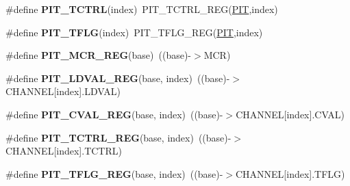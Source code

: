 \begin{DoxyCompactItemize}
\item 
\#define {\bfseries P\+I\+T\+\_\+\+T\+C\+T\+RL}(index)~P\+I\+T\+\_\+\+T\+C\+T\+R\+L\+\_\+\+R\+EG(\hyperlink{group__PIT__Peripheral__Access__Layer_gaf181c9e6602b6432a0bf1a9243808968}{P\+IT},index)\hypertarget{group__PIT__Register__Accessor__Macros_ga8208039ad04ced0f69ccc2cf4efd8e67}{}\label{group__PIT__Register__Accessor__Macros_ga8208039ad04ced0f69ccc2cf4efd8e67}

\item 
\#define {\bfseries P\+I\+T\+\_\+\+T\+F\+LG}(index)~P\+I\+T\+\_\+\+T\+F\+L\+G\+\_\+\+R\+EG(\hyperlink{group__PIT__Peripheral__Access__Layer_gaf181c9e6602b6432a0bf1a9243808968}{P\+IT},index)\hypertarget{group__PIT__Register__Accessor__Macros_ga8a2ba0e5f954639237f66f2613c60023}{}\label{group__PIT__Register__Accessor__Macros_ga8a2ba0e5f954639237f66f2613c60023}

\item 
\#define {\bfseries P\+I\+T\+\_\+\+M\+C\+R\+\_\+\+R\+EG}(base)~((base)-\/$>$M\+CR)\hypertarget{group__PIT__Register__Accessor__Macros_ga01f1ee5f7f451b1f6f7f1b3549c63303}{}\label{group__PIT__Register__Accessor__Macros_ga01f1ee5f7f451b1f6f7f1b3549c63303}

\item 
\#define {\bfseries P\+I\+T\+\_\+\+L\+D\+V\+A\+L\+\_\+\+R\+EG}(base,  index)~((base)-\/$>$C\+H\+A\+N\+N\+EL\mbox{[}index\mbox{]}.L\+D\+V\+AL)\hypertarget{group__PIT__Register__Accessor__Macros_gaa1c49ea81e45e7ae3407b2b804432381}{}\label{group__PIT__Register__Accessor__Macros_gaa1c49ea81e45e7ae3407b2b804432381}

\item 
\#define {\bfseries P\+I\+T\+\_\+\+C\+V\+A\+L\+\_\+\+R\+EG}(base,  index)~((base)-\/$>$C\+H\+A\+N\+N\+EL\mbox{[}index\mbox{]}.C\+V\+AL)\hypertarget{group__PIT__Register__Accessor__Macros_gaac9edbb5229fcbcd8d71f5fdeab96590}{}\label{group__PIT__Register__Accessor__Macros_gaac9edbb5229fcbcd8d71f5fdeab96590}

\item 
\#define {\bfseries P\+I\+T\+\_\+\+T\+C\+T\+R\+L\+\_\+\+R\+EG}(base,  index)~((base)-\/$>$C\+H\+A\+N\+N\+EL\mbox{[}index\mbox{]}.T\+C\+T\+RL)\hypertarget{group__PIT__Register__Accessor__Macros_gaa338edf83b961108a6dcdd43c80ed8c6}{}\label{group__PIT__Register__Accessor__Macros_gaa338edf83b961108a6dcdd43c80ed8c6}

\item 
\#define {\bfseries P\+I\+T\+\_\+\+T\+F\+L\+G\+\_\+\+R\+EG}(base,  index)~((base)-\/$>$C\+H\+A\+N\+N\+EL\mbox{[}index\mbox{]}.T\+F\+LG)\hypertarget{group__PIT__Register__Accessor__Macros_gae38fd2f9c8baca1504582bc5f3973932}{}\label{group__PIT__Register__Accessor__Macros_gae38fd2f9c8baca1504582bc5f3973932}


\end{DoxyCompactItemize}
